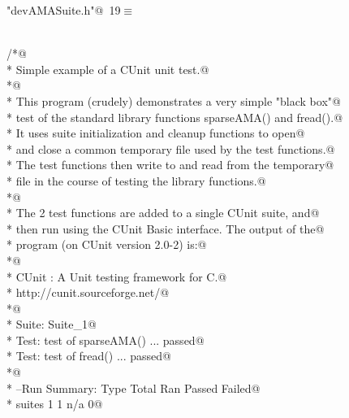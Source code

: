 \documentclass[12pt]{article}
\begin{document}
\begin{flushleft} \small
\begin{minipage}{\linewidth}\label{scrap7}\raggedright\small
{} \verb@"devAMASuite.h"@\nobreak\ {\footnotesize {19}}$\equiv$
\vspace{-1ex}
\begin{list}{}{} \item
\mbox{}\verb@@\\
\mbox{}\verb@/*@\\
\mbox{}\verb@ *  Simple example of a CUnit unit test.@\\
\mbox{}\verb@ *@\\
\mbox{}\verb@ *  This program (crudely) demonstrates a very simple "black box"@\\
\mbox{}\verb@ *  test of the standard library functions sparseAMA() and fread().@\\
\mbox{}\verb@ *  It uses suite initialization and cleanup functions to open@\\
\mbox{}\verb@ *  and close a common temporary file used by the test functions.@\\
\mbox{}\verb@ *  The test functions then write to and read from the temporary@\\
\mbox{}\verb@ *  file in the course of testing the library functions.@\\
\mbox{}\verb@ *@\\
\mbox{}\verb@ *  The 2 test functions are added to a single CUnit suite, and@\\
\mbox{}\verb@ *  then run using the CUnit Basic interface.  The output of the@\\
\mbox{}\verb@ *  program (on CUnit version 2.0-2) is:@\\
\mbox{}\verb@ *@\\
\mbox{}\verb@ *           CUnit : A Unit testing framework for C.@\\
\mbox{}\verb@ *           http://cunit.sourceforge.net/@\\
\mbox{}\verb@ *@\\
\mbox{}\verb@ *       Suite: Suite_1@\\
\mbox{}\verb@ *         Test: test of sparseAMA() ... passed@\\
\mbox{}\verb@ *         Test: test of fread() ... passed@\\
\mbox{}\verb@ *@\\
\mbox{}\verb@ *       --Run Summary: Type      Total     Ran  Passed  Failed@\\
\mbox{}\verb@ *                      suites        1       1     n/a       0@\\

\end{list}
\end{minipage}
\end{flushleft}
\end{document}
